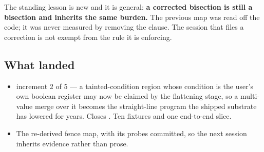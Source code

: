 The standing lesson is new and it is general: \textbf{a corrected bisection is still a bisection and
inherits the same burden.} The previous map was read off the code; it was never measured by removing
the clause. The session that files a correction is not exempt from the rule it is enforcing.

\subsection*{What landed}
\begin{itemize}
  \item {} increment 2 of 5 --- a tainted-condition region whose condition is the user's own
        boolean register may now be claimed by the flattening stage, so a multi-value merge over it
        becomes the straight-line program the shipped substrate has lowered for years. Closes
        . Ten fixtures and one end-to-end slice.
  \item The re-derived fence map, with its probes committed, so the next session inherits evidence
        rather than prose.
\end{itemize}

